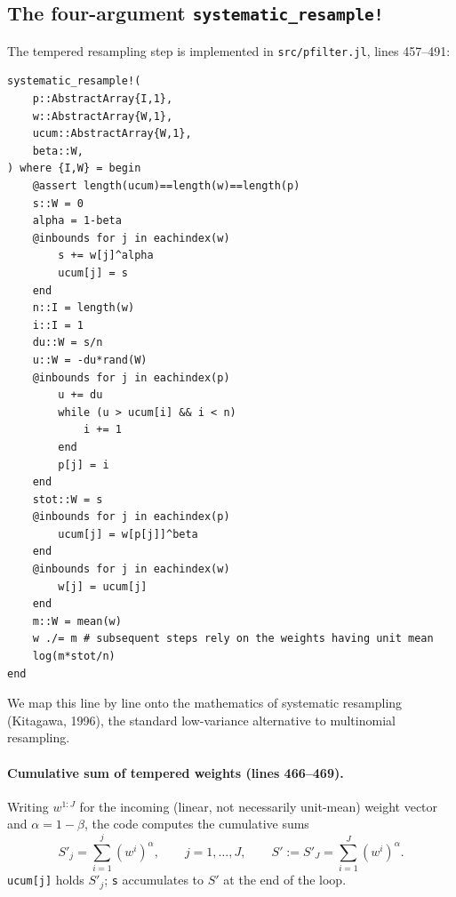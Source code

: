 \documentclass[11pt]{article}
\begin{document}
\subsection{The four-argument \texttt{systematic\_resample!}}

The tempered resampling step is implemented in \texttt{src/pfilter.jl},
lines 457--491:

\begin{lstlisting}[caption={\texttt{systematic\_resample!}, power-tempered systematic resampling (\texttt{pfilter.jl}, lines 457--491)}]
systematic_resample!(
    p::AbstractArray{I,1},
    w::AbstractArray{W,1},
    ucum::AbstractArray{W,1},
    beta::W,
) where {I,W} = begin
    @assert length(ucum)==length(w)==length(p)
    s::W = 0
    alpha = 1-beta
    @inbounds for j in eachindex(w)
        s += w[j]^alpha
        ucum[j] = s
    end
    n::I = length(w)
    i::I = 1
    du::W = s/n
    u::W = -du*rand(W)
    @inbounds for j in eachindex(p)
        u += du
        while (u > ucum[i] && i < n)
            i += 1
        end
        p[j] = i
    end
    stot::W = s
    @inbounds for j in eachindex(p)
        ucum[j] = w[p[j]]^beta
    end
    @inbounds for j in eachindex(w)
        w[j] = ucum[j]
    end
    m::W = mean(w)
    w ./= m # subsequent steps rely on the weights having unit mean
    log(m*stot/n)
end
\end{lstlisting}

We map this line by line onto the mathematics of systematic resampling
(Kitagawa, 1996), the standard low-variance alternative to multinomial
resampling.

\paragraph{Cumulative sum of tempered weights (lines 466--469).} Writing
$w^{1:J}$ for the incoming (linear, not necessarily unit-mean) weight vector
and $\alpha = 1-\beta$, the code computes the cumulative sums
\[
S'_j = \sum_{i=1}^{j} (w^i)^{\alpha}, \qquad j=1,\dots,J, \qquad S' := S'_J = \sum_{i=1}^J (w^i)^{\alpha}.
\]
\texttt{ucum[j]} holds $S'_j$; \texttt{s} accumulates to $S'$ at the end of the
loop.
\end{document}
